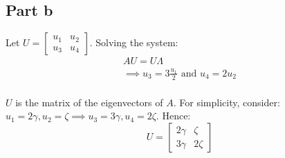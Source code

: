 \documentclass{article}
\begin{document}
\subsection*{Part b}
\begin{flushleft}
Let \(U = \begin{bmatrix} u_{1} & u_{2} \\ u_{3} & u_{4} \end{bmatrix}\).
Solving the system:
\begin{gather*}
AU = U\Lambda \\
\implies u_{3} = 3\frac{u_{1}}{2} \text{ and } u_{4} = 2u_{2} \\
\end{gather*}

\(U\) is the matrix of the eigenvectors of \(A\). For simplicity, consider: \(u_{1} = 2\gamma, u_{2} = \zeta \implies u_{3} = 3\gamma, u_{4} = 2\zeta\). Hence:
\begin{equation*}
U = \begin{bmatrix}
2\gamma & \zeta \\ 3\gamma & 2\zeta 
\end{bmatrix}
\end{equation*}
\end{flushleft}
\end{document}
